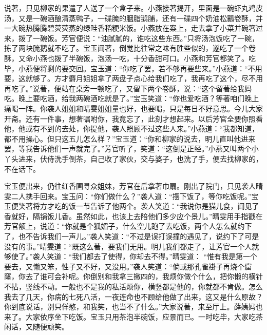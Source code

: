 \begin{parag}
    说著，只见柳家的果遣了人送了一个盒子来。小燕接著揭开，里面是一碗虾丸鸡皮汤，又是一碗酒酿清蒸鸭子，一碟腌的胭脂鹅脯，还有一碟四个奶油松瓤卷酥，并一大碗热腾腾碧荧荧蒸的绿畦香稻粳米饭。小燕放在案上，走去拿了小菜并碗箸过来，拨了一碗饭。芳官便说：“油腻腻的，谁吃这些东西。”只将汤泡饭吃了一碗，拣了两块腌鹅就不吃了。宝玉闻著，倒觉比往常之味有胜些似的，遂吃了一个卷酥，又命小燕也拨了半碗饭，泡汤一吃，十分香甜可口。小燕和芳官都笑了。吃毕，小燕便将剩的要交回。宝玉道：“你吃了罢，若不够再要些来。”小燕道：“不用要，这就够了。方才麝月姐姐拿了两盘子点心给我们吃了，我再吃了这个，尽不用再吃了。”说著，便站在桌旁一顿吃了，又留下两个卷酥，说：“这个留著给我妈吃。晚上要吃酒，给我两碗酒吃就是了。”宝玉笑道：“你也爱吃酒？等著咱们晚上痛喝一阵。你袭人姐姐和晴雯姐姐量也好，也要喝，只是每日不好意思。今儿大家开斋。还有一件事，想著嘱咐你，我竟忘了，此刻才想起来。以后芳官全要你照看他，他或有不到的去处，你提他，袭人照顾不过这些人来。”小燕道：“我都知道，都不用操心。但只这五儿怎么样？”宝玉道：“你和柳家的说去，明儿直叫他进来罢，等我告诉他们一声就完了。”芳官听了，笑道：“这倒是正经。”小燕又叫两个小丫头进来，伏侍洗手倒茶，自己收了家伙，交与婆子，也洗了手，便去找柳家的，不在话下。
\end{parag}


\begin{parag}
    宝玉便出来，仍往红香圃寻众姐妹，芳官在后拿著巾扇。刚出了院门，只见袭人晴雯二人携手回来。宝玉问：“你们做什么？”袭人道：“摆下饭了，等你吃饭呢。”宝玉便笑著将方才吃的饭一节告诉了他两个。袭人笑道：“我说你是猫儿食，闻见了香就好，隔锅饭儿香。虽然如此，也该上去陪他们多少应个景儿。”晴雯用手指戳在芳官额上，说道：“你就是个狐媚子，什么空儿跑了去吃饭，两个人怎么就约下了，也不告诉我们一声儿。”袭人笑道：“不过是误打误撞的遇见了，说约下了可是没有的事。”晴雯道：“既这么著，要我们无用。明儿我们都走了，让芳官一个人就够使了。”袭人笑道：“我们都去了使得，你却去不得。”晴雯道： “惟有我是第一个要去，又懒又笨，性子又不好，又没用。”袭人笑道：“倘或那孔雀褂子再烧个窟窿，你去了谁可会补呢。你倒别和我拿三撇四的，我烦你做个什么，把你懒的横针不拈，竖线不动。一般也不是我的私活烦你，横竖都是他的，你就都不肯做。怎么我去了几天，你病的七死八活，一夜连命也不顾给他做了出来，这又是什么原故？你到底说话，别只佯憨，和我笑，也当不了什么。”大家说著，来至厅上。薛姨妈也来了。大家依序坐下吃饭。宝玉只用茶泡半碗饭，应景而已。一时吃毕，大家吃茶闲话，又随便顽笑。
\end{parag}


